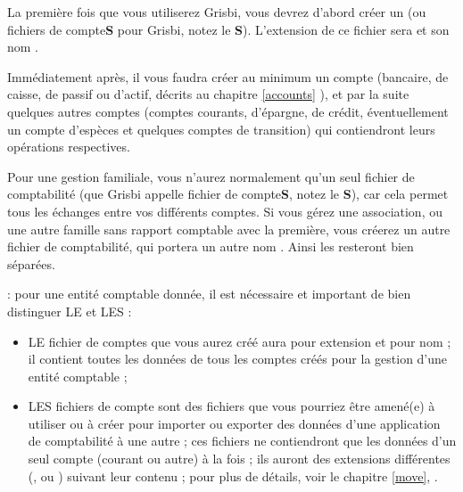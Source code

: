 La première fois que vous utiliserez Grisbi, vous devrez d'abord créer un  (ou fichiers de compte\textbf{S} pour Grisbi, notez le \textbf{S}). L'\gls{extension} de ce fichier sera  et son nom . 

Immédiatement après, il vous faudra créer au minimum un compte (bancaire, de caisse, de passif ou d'actif, décrits au chapitre \vref{accounts} ), et par la suite quelques autres comptes (comptes courants, d'épargne, de crédit, éventuellement un compte d'espèces et quelques comptes de transition) qui contiendront leurs opérations respectives. 

Pour une gestion familiale, vous n'aurez normalement qu'un seul fichier de comptabilité (que Grisbi appelle fichier de compte\textbf{S}, notez le \textbf{S}), car cela permet tous les échanges entre vos différents comptes. Si vous gérez une association, ou une autre famille sans rapport comptable avec la première, vous créerez un autre fichier de comptabilité, qui portera un autre nom . Ainsi les  resteront bien séparées.

\textcolor{red}{} : pour une entité comptable donnée, il est nécessaire et important de bien distinguer LE \og {} \fg{} et LES \og {} \fg{} :

\begin{itemize}
	\item LE \og fichier de comptes \fg{} que vous aurez créé aura pour extension  et pour nom  ; il contient toutes les données de tous les comptes créés pour la gestion d'une entité comptable ;
	\item LES \og fichiers de compte \fg{} sont des fichiers que vous pourriez être amené(e) à utiliser ou à créer pour importer ou exporter des données d'une application de comptabilité à une autre ; ces fichiers ne contiendront que les données d'un seul compte (courant ou autre) à la fois ; ils auront des extensions différentes (,  ou ) suivant leur contenu ; pour plus de détails, voir le chapitre \vref{move}, .
\end{itemize}

